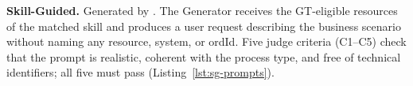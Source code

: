 
\medskip\noindent\textbf{Skill-Guided.} Generated by . The Generator receives the GT-eligible resources of the matched skill and produces a user request describing the business scenario without naming any resource, system, or ordId. Five judge criteria (C1--C5) check that the prompt is realistic, coherent with the process type, and free of technical identifiers; all five must pass (Listing~\ref{lst:sg-prompts}).

